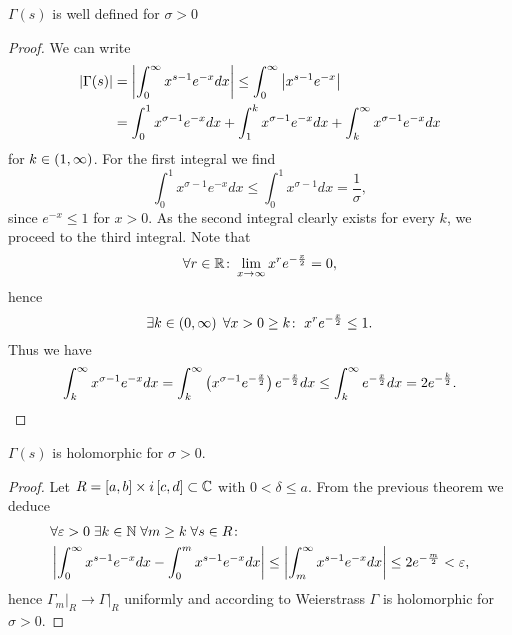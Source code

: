 \begin{theorem}
	$\Gamma(s)$ is well defined for $\sigma > 0$
\end{theorem}
\begin{proof}
	We can write
\begin{equation*}
\begin{aligned}
	\left|\Gamma(s)\right|
	&= \left|\int _0 ^\infty x^{s - 1} e^{-x} dx\right| \leq \int _0 ^\infty \left|x^{s - 1} e^{-x}\right| \\
	&= \int _0 ^1 x^{\sigma - 1} e^{-x} dx + \int _1 ^k x^{\sigma - 1} e^{-x} dx + \int _k ^\infty x^{\sigma - 1} e^{-x} dx
\end{aligned}
\end{equation*}
	for $k \in \left(1, \infty\right)$. For the first integral we find
\begin{equation*}
	\int _0 ^1 x^{\sigma - 1} e^{-x} dx \leq \int _0 ^1 x^{\sigma - 1} dx = \frac{1}{\sigma},
\end{equation*}
	since $e^{-x} \leq 1$ for $x > 0$. As the second integral clearly exists for every $k$, we proceed to the third integral. Note that
\begin{equation*}
	\forall r \in \mathbb{R} \colon \lim\limits_{x \to \infty} x^r e^{-\frac{x}{2}} = 0,
\end{equation*}
 	hence
\begin{equation*}
	\exists k \in \left(0, \infty\right) \; \forall x > 0 \geq k \colon \; x^r e^{-\frac{x}{2}} \leq 1.
\end{equation*}
	Thus we have
\begin{equation*}
	\int _k ^\infty x^{\sigma - 1} e^{-x} dx = \int _k ^\infty \left(x^{\sigma - 1} e^{-\frac{x}{2}}\right) e^{-\frac{x}{2}} dx \leq \int _k ^\infty e^{-\frac{x}{2}} dx = 2 e^{-\frac{k}{2}}.
\end{equation*}
\end{proof}


\begin{theorem}
	$\Gamma(s)$ is holomorphic for $\sigma > 0$.
\end{theorem}
\begin{proof}
	Let $R = \left[a, b\right] \times i\left[c, d\right] \subset \mathbb{C}$ with $0 < \delta \leq a$. From the previous theorem we deduce
\begin{equation*}
\begin{aligned}
	&\forall \varepsilon > 0 \; \exists k \in \mathbb{N} \; \forall m \geq k \; \forall s \in R \colon \\
	&\left|\int _0 ^\infty x^{s - 1} e^{-x} dx - \int _0 ^m x^{s - 1} e^{-x} dx\right| \leq \left|\int _m ^\infty x^{s - 1} e^{-x} dx\right| \leq 2 e^{-\frac{m}{2}} < \varepsilon,
\end{aligned}
\end{equation*}
	hence $\Gamma_m \big\vert _R \to \Gamma \big\vert _R$ uniformly and according to Weierstrass $\Gamma$ is holomorphic for $\sigma > 0$.
\end{proof}


